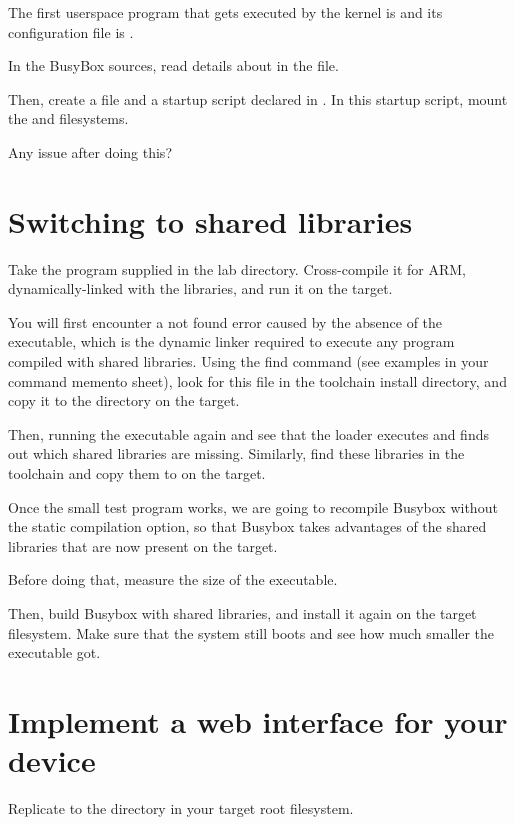 The first userspace program that gets executed by the kernel is
 and its configuration file is .

In the BusyBox sources, read details about  in the
 file.

Then, create a  file and a 
startup script declared in . In this startup
script, mount the  and  filesystems.

Any issue after doing this?

\section{Switching to shared libraries}

Take the  program supplied in the lab \code{~\labs\busybox}
directory. Cross-compile it for ARM, dynamically-linked with the
libraries, and run it on the target.

You will first encounter a not found error caused by the absence of
the  executable, which is the dynamic linker
required to execute any program compiled with shared libraries. Using
the find command (see examples in your command memento sheet), look
for this file in the toolchain install directory, and copy it to the
 directory on the target.

Then, running the executable again and see that the loader executes
and finds out which shared libraries are missing. Similarly, find
these libraries in the toolchain and copy them to  on the
target.

Once the small test program works, we are going to recompile Busybox
without the static compilation option, so that Busybox takes advantages of the
shared libraries that are now present on the target.

Before doing that, measure the size of the  executable.

Then, build Busybox with shared libraries, and install it again on the
target filesystem. Make sure that the system still boots and see
how much smaller the  executable got.


\section{Implement a web interface for your device}

Replicate  to the  directory in your target root filesystem.

